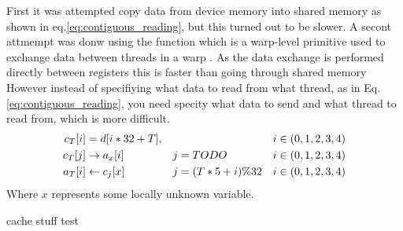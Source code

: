 First it was attempted copy data from device memory into shared memory as shown in eq.\ref{eq:contiguous_reading}, but this turned out to be slower.
A secont attmempt was donw using the  function which is a warp-level primitive used to exchange data between threads in a warp \cite{linUsingCUDAWarpLevel2018}.
As the data exchange is performed directly between registers this is faster than going through shared memory \cite{linUsingCUDAWarpLevel2018}
However instead of specifiying what data to read from what thread, as in Eq. \ref{eq:contiguous_reading}, you need specity what data to send and what thread to read from, which is more difficult.
\begin{align}
    c_T[i] & = d[i*32+T],       &   &                 & i & \in (0,1,2,3,4) \\
    c_T[j] & \rightarrow a_x[i] & j & = TODO         & i & \in (0,1,2,3,4) \\
    a_T[i] & \leftarrow c_j[x]  & j & = (T*5 + i)\%32 & i & \in (0,1,2,3,4)
    \label{eq:contiguous_reading}
\end{align}
Where $x$ represents some locally unknown variable.

\todo cache stuff test


